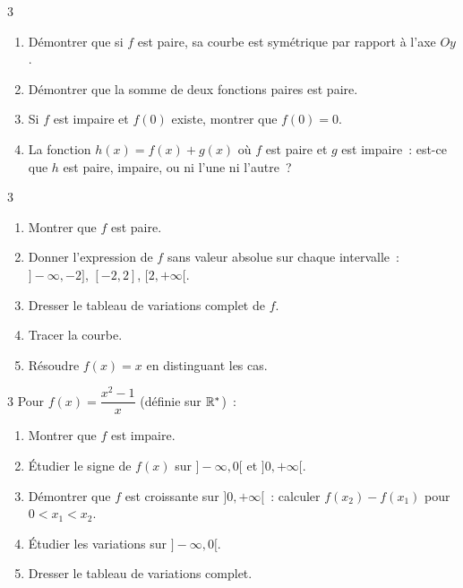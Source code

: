 \begin{exo}{3}
\begin{enumerate}
  \item D\'emontrer que si $f$ est paire, sa courbe est sym\'etrique par
        rapport \`a l'axe $Oy$.
  \item D\'emontrer que la somme de deux fonctions paires est paire.
  \item Si $f$ est impaire et $f(0)$ existe, montrer que $f(0)=0$.
  \item La fonction $h(x)=f(x)+g(x)$ o\`u $f$ est paire et $g$ est impaire~:
        est-ce que $h$ est paire, impaire, ou ni l'une ni l'autre~?
\end{enumerate}
\end{exo}

\begin{exo}[$f(x)=|x^2-4|$~: \'etude compl\`ete \corrige]{3}
\begin{enumerate}
  \item Montrer que $f$ est paire.
  \item Donner l'expression de $f$ sans valeur absolue sur chaque intervalle~:
        $]-\infty,-2]$, $[-2,2]$, $[2,+\infty[$.
  \item Dresser le tableau de variations complet de $f$.
  \item Tracer la courbe.
  \item R\'esoudre $f(x)=x$ en distinguant les cas.
\end{enumerate}
\end{exo}

\begin{exo}{3}
Pour $f(x)=\dfrac{x^2-1}{x}$ (d\'efinie sur $\mathbb{R}^*$)~:
\begin{enumerate}
  \item Montrer que $f$ est impaire.
  \item \'Etudier le signe de $f(x)$ sur $]-\infty,0[$ et $]0,+\infty[$.
  \item D\'emontrer que $f$ est croissante sur $]0,+\infty[$~:
        calculer $f(x_2)-f(x_1)$ pour $0<x_1<x_2$.
  \item \'Etudier les variations sur $]-\infty,0[$.
  \item Dresser le tableau de variations complet.
\end{enumerate}
\end{exo}

